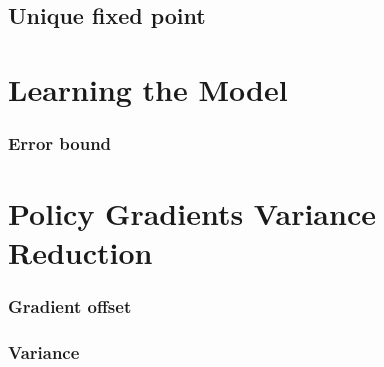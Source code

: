 \documentclass[11pt,english]{article}
\begin{document}
    \pagebreak
    \subsection{Unique fixed point}
    

    \pagebreak
    \section{Learning the Model}
    \subsubsection{Error bound}
    

    \pagebreak
    \section{Policy Gradients Variance Reduction}
    \subsubsection{Gradient offset}
    

    \pagebreak
    \subsubsection{Variance}
    
\end{document}
